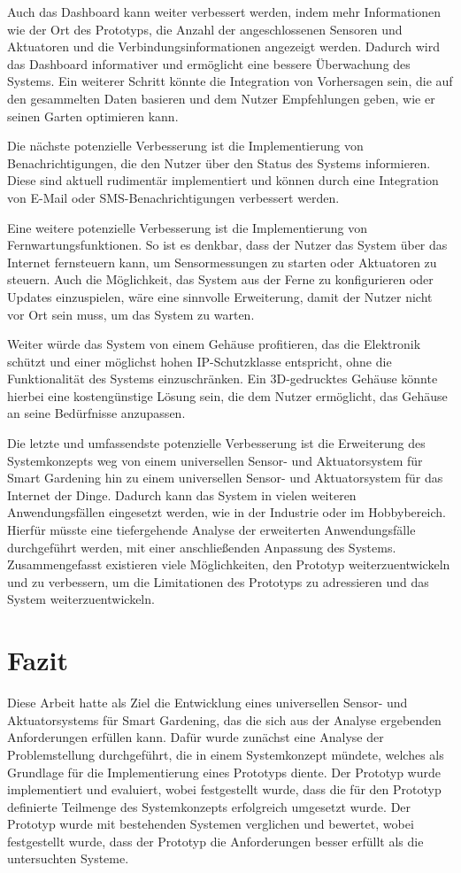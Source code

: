 Auch das Dashboard kann weiter verbessert werden, indem mehr Informationen wie der Ort des Prototyps, die Anzahl der angeschlossenen Sensoren und Aktuatoren und die Verbindungsinformationen angezeigt werden.
Dadurch wird das Dashboard informativer und ermöglicht eine bessere Überwachung des Systems.
Ein weiterer Schritt könnte die Integration von Vorhersagen sein, die auf den gesammelten Daten basieren und dem Nutzer Empfehlungen geben, wie er seinen Garten optimieren kann.

Die nächste potenzielle Verbesserung ist die Implementierung von Benachrichtigungen, die den Nutzer über den Status des Systems informieren.
Diese sind aktuell rudimentär implementiert und können durch eine Integration von E-Mail oder SMS-Benachrichtigungen verbessert werden.

Eine weitere potenzielle Verbesserung ist die Implementierung von Fernwartungsfunktionen.
So ist es denkbar, dass der Nutzer das System über das Internet fernsteuern kann, um Sensormessungen zu starten oder Aktuatoren zu steuern.
Auch die Möglichkeit, das System aus der Ferne zu konfigurieren oder Updates einzuspielen, wäre eine sinnvolle Erweiterung, damit der Nutzer nicht vor Ort sein muss, um das System zu warten.

Weiter würde das System von einem Gehäuse profitieren, das die Elektronik schützt und einer möglichst hohen IP-Schutzklasse entspricht, ohne die Funktionalität des Systems einzuschränken.
Ein 3D-gedrucktes Gehäuse könnte hierbei eine kostengünstige Lösung sein, die dem Nutzer ermöglicht, das Gehäuse an seine Bedürfnisse anzupassen.

Die letzte und umfassendste potenzielle Verbesserung ist die Erweiterung des Systemkonzepts weg von einem universellen Sensor- und Aktuatorsystem für Smart Gardening hin zu einem universellen Sensor- und Aktuatorsystem für das Internet der Dinge.
Dadurch kann das System in vielen weiteren Anwendungsfällen eingesetzt werden, wie in der Industrie oder im Hobbybereich.
Hierfür müsste eine tiefergehende Analyse der erweiterten Anwendungsfälle durchgeführt werden, mit einer anschließenden Anpassung des Systems.
Zusammengefasst existieren viele Möglichkeiten, den Prototyp weiterzuentwickeln und zu verbessern, um die Limitationen des Prototyps zu adressieren und das System weiterzuentwickeln.


\section{Fazit}
Diese Arbeit hatte als Ziel die Entwicklung eines universellen Sensor- und Aktuatorsystems für Smart Gardening, das die sich aus der Analyse ergebenden Anforderungen erfüllen kann.
Dafür wurde zunächst eine Analyse der Problemstellung durchgeführt, die in einem Systemkonzept mündete, welches als Grundlage für die Implementierung eines Prototyps diente.
Der Prototyp wurde implementiert und evaluiert, wobei festgestellt wurde, dass die für den Prototyp definierte Teilmenge des Systemkonzepts erfolgreich umgesetzt wurde.
Der Prototyp wurde mit bestehenden Systemen verglichen und bewertet, wobei festgestellt wurde, dass der Prototyp die Anforderungen besser erfüllt als die untersuchten Systeme.

